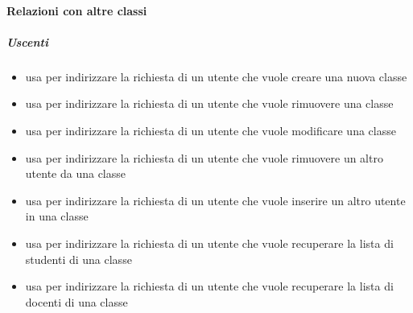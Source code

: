 \paragraph{Relazioni con altre classi}
\subparagraph{Uscenti}
\begin{itemize}
\item usa  per indirizzare la richiesta di un utente che vuole creare una nuova classe
\item usa  per indirizzare la richiesta di un utente che vuole rimuovere una classe
\item usa  per indirizzare la richiesta di un utente che vuole modificare una classe
\item usa  per indirizzare la richiesta di un utente che vuole rimuovere un altro utente da una classe
\item usa  per indirizzare la richiesta di un utente che vuole inserire un altro utente in una classe
\item usa  per indirizzare la richiesta di un utente che vuole recuperare la lista di studenti di una classe
\item usa  per indirizzare la richiesta di un utente che vuole recuperare la lista di docenti di una classe
\end{itemize}
